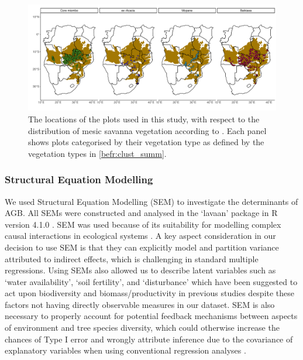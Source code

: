 \begin{refsection}




\begin{landscape}
\begin{figure}
	\includegraphics[width=1.4\linewidth]{img/clust_map}
	\caption[Plot locations used in analysis, grouped by vegetation type]{The locations of the \nplots{} plots used in this study, with respect to the distribution of mesic savanna vegetation according to \citet{White1983}. Each panel shows plots categorised by their vegetation type as defined by the vegetation types in \autoref{befr:clust_summ}.}
	\label{befr:clust_map}
\end{figure}
\end{landscape}

\subsubsection{Structural Equation Modelling}
\label{befr:sssec:sem}

We used Structural Equation Modelling (SEM) to investigate the determinants of AGB. All SEMs were constructed and analysed in the `lavaan' package \citep{lavaan} in R version 4.1.0 \citep{R2020}. SEM was used because of its suitability for modelling complex causal interactions in ecological systems \citep{Lee2007}. A key aspect consideration in our decision to use SEM is that they can explicitly model and partition variance attributed to indirect effects, which is challenging in standard multiple regressions. Using SEMs also allowed us to describe latent variables such as `water availability', `soil fertility', and `disturbance' which have been suggested to act upon biodiversity and biomass/productivity in previous studies despite these factors not having directly observable measures in our dataset. SEM is also necessary to properly account for potential feedback mechanisms between aspects of environment and tree species diversity, which could otherwise increase the chances of Type I error and wrongly attribute inference due to the covariance of explanatory variables when using conventional regression analyses \citep{Nachtigall2003}.


\end{refsection}
